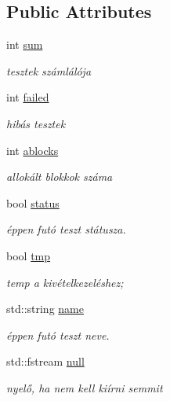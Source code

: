 \subsection*{Public Attributes}
\begin{DoxyCompactItemize}
\item 
int \hyperlink{structgtest__lite_1_1_test_a6da678d43b72b9e2bff1c99e1d3c48f5}{sum}
\begin{DoxyCompactList}\small\item\em tesztek számlálója \end{DoxyCompactList}\item 
int \hyperlink{structgtest__lite_1_1_test_a4fb6ee7bd903717d970e3f0504cdeeab}{failed}
\begin{DoxyCompactList}\small\item\em hibás tesztek \end{DoxyCompactList}\item 
int \hyperlink{structgtest__lite_1_1_test_a91d9c63794d2b9b49e0c48d897208560}{ablocks}
\begin{DoxyCompactList}\small\item\em allokált blokkok száma \end{DoxyCompactList}\item 
bool \hyperlink{structgtest__lite_1_1_test_a59a9a7f0ef7867af604ce5678f7a2c13}{status}
\begin{DoxyCompactList}\small\item\em éppen futó teszt státusza. \end{DoxyCompactList}\item 
bool \hyperlink{structgtest__lite_1_1_test_a1145ceb335a60a808b7b4d5d1624b2a5}{tmp}
\begin{DoxyCompactList}\small\item\em temp a kivételkezeléshez; \end{DoxyCompactList}\item 
std\+::string \hyperlink{structgtest__lite_1_1_test_a8d495a42580e3ae337f9c4982136b700}{name}
\begin{DoxyCompactList}\small\item\em éppen futó teszt neve. \end{DoxyCompactList}\item 
std\+::fstream \hyperlink{structgtest__lite_1_1_test_af4784302d78bb004bcb20b7f75ec06c3}{null}
\begin{DoxyCompactList}\small\item\em nyelő, ha nem kell kiírni semmit \end{DoxyCompactList}\end{DoxyCompactItemize}


